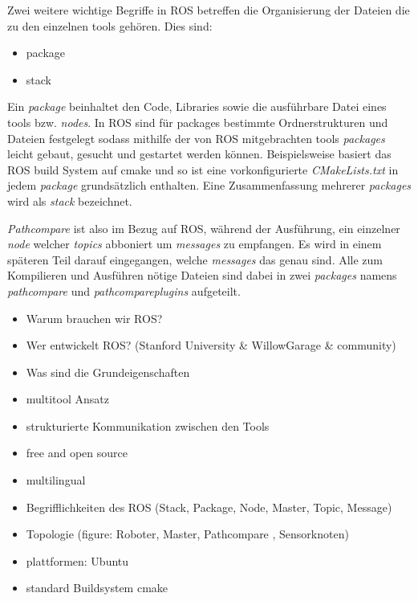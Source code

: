 Zwei weitere wichtige Begriffe in \gls{ROS} betreffen die Organisierung der
Dateien die zu den einzelnen tools gehören. Dies sind:

\begin{itemize}
  \item package
  \item stack
\end{itemize}

Ein \textit{package} beinhaltet den Code, Libraries sowie die ausführbare Datei eines
tools bzw. \textit{nodes}.
In \gls{ROS} sind für packages bestimmte Ordnerstrukturen und Dateien
festgelegt sodass mithilfe der von \gls{ROS} mitgebrachten tools \textit{packages}
leicht gebaut, gesucht und gestartet werden können. Beispielsweise basiert das 
\gls{ROS} build System auf cmake und so ist eine vorkonfigurierte
\textit{CMakeLists.txt} in jedem \textit{package} grundsätzlich enthalten. Eine Zusammenfassung mehrerer
\textit{packages} wird als \textit{stack} bezeichnet. 

\textit{Pathcompare} ist also im Bezug auf \gls{ROS}, während der Ausführung, ein
einzelner \textit{node} welcher \textit{topics} abboniert um \textit{messages}
zu empfangen. Es wird in einem
späteren Teil darauf eingegangen, welche \textit{messages} das genau sind.
Alle zum Kompilieren und Ausführen nötige Dateien sind dabei in zwei \textit{packages} namens \textit{pathcompare}
und \textit{pathcompareplugins} aufgeteilt.


\begin{itemize}
  \item Warum brauchen wir ROS?
  \item Wer entwickelt ROS? (Stanford University \& WillowGarage \& community)
  \item Was sind die Grundeigenschaften 
  \item multitool Ansatz
  \item strukturierte Kommunikation zwischen den Tools
  \item free and open source
  \item multilingual 
  \item Begrifflichkeiten des ROS (Stack, Package, Node, Master, Topic, Message)
  \item Topologie (figure: Roboter, Master, Pathcompare , Sensorknoten)
  \item plattformen: Ubuntu
  \item standard Buildsystem cmake
\end{itemize}

